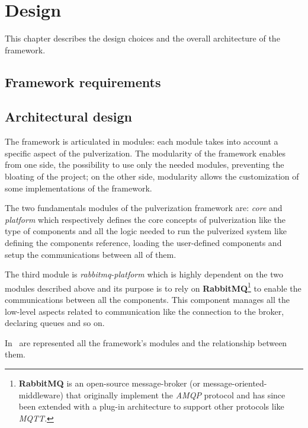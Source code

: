\chapter{Design} %
\label{chap:design}

This chapter describes the design choices and the overall architecture of the framework. 

\section{Framework requirements}
\label{sec:framework-requirements}

\section{Architectural design}
\label{sec:arch-design}

The framework is articulated in modules: each module takes into account a specific aspect of the pulverization.
The modularity of the framework enables from one side, the possibility to use only the needed modules, preventing the bloating of the project;
on the other side, modularity allows the customization of some implementations of the framework.

The two fundamentals modules of the pulverization framework are: \emph{core} and \emph{platform} which respectively defines the core concepts
of pulverization like the type of components and all the logic needed to run the pulverized system like defining the components reference,
loading the user-defined components and setup the communications between all of them.

The third module is \emph{rabbitmq-platform} which is highly dependent on the two modules described above and its purpose is to rely on
\textbf{RabbitMQ}\footnote{\textbf{RabbitMQ} is an open-source message-broker (or message-oriented-middleware) that originally implement
the \emph{AMQP} protocol and has since been extended with a plug-in architecture to support other protocols like \emph{MQTT}.} to enable
the communications between all the components.
This component manages all the low-level aspects related to communication like the connection to the broker, declaring queues and so on.

In~ are represented all the framework's modules and the relationship between them.

